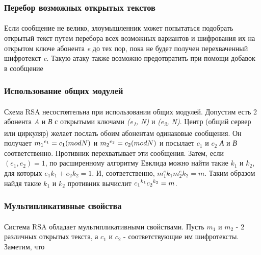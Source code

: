 \subsubsection{Перебор возможных открытых текстов}

  \paragraph{} Если сообщение не велико, злоумышленник может попытаться подобрать открытый текст путем перебора всех возможных вариантов и 
  шифрования их на открытом ключе абонента \textit{e} до тех пор, пока не будет получен перехваченный шифротекст \textit{c}. Такую атаку также возможно 
  предотвратить при помощи добавок в сообщение

\subsubsection{Использование общих модулей}

  \paragraph{} Схема RSA несостоятельна при использовании общих модулей. Допустим есть 2 абонента \textit{A} и \textit{В} с открытыми ключами 
  \textit{(e\textsubscript{1}, N)} и \textit{(e\textsubscript{2}, N)}. Центр (общий сервер или циркуляр) желает послать обоим абонентам одинаковые сообщения. 
  Он получает \textit{{$m_1\textsuperscript{{$e_1$}} = c_1(mod N)$}} и \textit{{$m_2\textsuperscript{{$e_2$}} = c_2(mod N)$}} и посылает \textit{{$c_1$}} и 
  \textit{{$c_2$}} \textit{А} и \textit{В} соответственно. Противник перехватывает эти сообщения. Затем, если \textit{{$(e_1, e_2) = 1$}}, по 
  расширенному алгоритму Евклида можно найти такие \textit{{$k_1$}} и \textit{{$k_2$}}, для которых \textit{{$e_1 k_1 + e_2 k_2 = 1$}}. И, соответственно, 
  \textit{{$m_1^e k_1 m_2^e k_2 = m$}}. Таким образом найдя такие \textit{{$k_1$}} и \textit{{$k_2$}} противник вычислит 
  \textit{{$c_1\textsuperscript{{$k_1$}} c_2\textsuperscript{{$k_2$}} = m$}}.

\subsubsection{Мультипликативные свойства}

  \paragraph{} Система RSA обладает мультипликативными свойствами. Пусть \textit{{$m_1$}} и \textit{{$m_2$}} - 2 различных открытых текста, а \textit{{$c_1$}}
  и \textit{{$c_2$}} - соответствующие им шифротексты. Заметим, что
  
